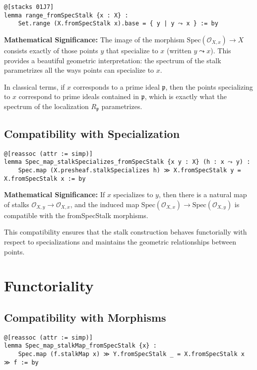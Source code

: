 \documentclass{article}
\theoremstyle{definition}
\begin{document}
\begin{lstlisting}
@[stacks 01J7]
lemma range_fromSpecStalk {x : X} :
    Set.range (X.fromSpecStalk x).base = { y | y ⤳ x } := by
\end{lstlisting}

\textbf{Mathematical Significance:} The image of the morphism $\mathrm{Spec}(\mathcal{O}_{X,x}) \to X$ consists exactly of those points $y$ that specialize to $x$ (written $y \leadsto x$). This provides a beautiful geometric interpretation: the spectrum of the stalk parametrizes all the ways points can specialize to $x$.

In classical terms, if $x$ corresponds to a prime ideal $\mathfrak{p}$, then the points specializing to $x$ correspond to prime ideals contained in $\mathfrak{p}$, which is exactly what the spectrum of the localization $R_\mathfrak{p}$ parametrizes.

\subsection{Compatibility with Specialization}

\begin{lstlisting}
@[reassoc (attr := simp)]
lemma Spec_map_stalkSpecializes_fromSpecStalk {x y : X} (h : x ⤳ y) :
    Spec.map (X.presheaf.stalkSpecializes h) ≫ X.fromSpecStalk y = X.fromSpecStalk x := by
\end{lstlisting}

\textbf{Mathematical Significance:} If $x$ specializes to $y$, then there is a natural map of stalks $\mathcal{O}_{X,y} \to \mathcal{O}_{X,x}$, and the induced map $\mathrm{Spec}(\mathcal{O}_{X,x}) \to \mathrm{Spec}(\mathcal{O}_{X,y})$ is compatible with the fromSpecStalk morphisms.

This compatibility ensures that the stalk construction behaves functorially with respect to specializations and maintains the geometric relationships between points.

\section{Functoriality}

\subsection{Compatibility with Morphisms}

\begin{lstlisting}
@[reassoc (attr := simp)]
lemma Spec_map_stalkMap_fromSpecStalk {x} :
    Spec.map (f.stalkMap x) ≫ Y.fromSpecStalk _ = X.fromSpecStalk x ≫ f := by
\end{lstlisting}
\end{document}
